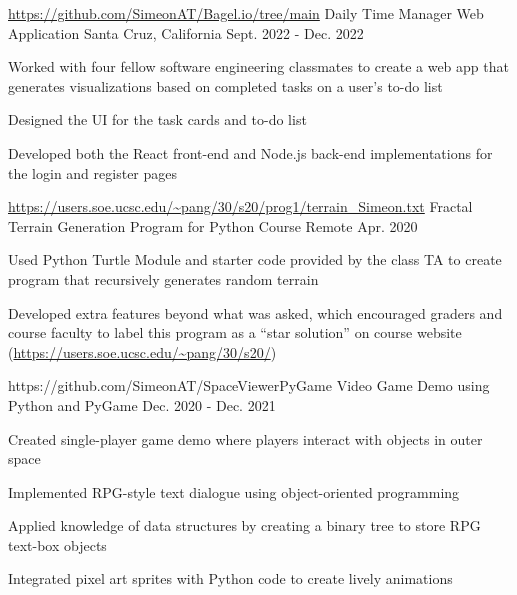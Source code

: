

\begin{cventries}

  \cventry
    {\url{https://github.com/SimeonAT/Bagel.io/tree/main}} %
    {Daily Time Manager Web Application} %
    {Santa Cruz, California} %
    {Sept. 2022 - Dec. 2022} %
    {
      \begin{cvitems} %
        \item { Worked with four fellow software engineering classmates to create a web app that generates
                visualizations based on completed tasks on a user’s to-do list}
        \item {Designed the UI for the task cards and to-do list}
        \item {Developed both the React front-end and Node.js back-end implementations for the login and register
               pages}
      \end{cvitems}
    }

    \cventry
    {\url{https://users.soe.ucsc.edu/~pang/30/s20/prog1/terrain_Simeon.txt}} %
    {Fractal Terrain Generation Program for Python Course} %
    {Remote} %
    {Apr. 2020} %
    {
      \begin{cvitems} %
        \item {Used Python Turtle Module and starter code provided by the class TA to create program that
               recursively generates random terrain}
        \item {Developed extra features beyond what was asked, which encouraged graders and course faculty
               to label this program as a “star solution” on course website (\url{https://users.soe.ucsc.edu/~pang/30/s20/})}
      \end{cvitems}
    }

    \cventry
    {https://github.com/SimeonAT/SpaceViewerPyGame} %
    {Video Game Demo using Python and PyGame} %
    {} %
    {Dec. 2020 - Dec. 2021} %
    {
      \begin{cvitems} %
        \item {Created single-player game demo where players interact with objects in outer space}
        \item {Implemented RPG-style text dialogue using object-oriented programming}
        \item {Applied knowledge of data structures by creating a binary tree to store RPG text-box objects}
        \item {Integrated pixel art sprites with Python code to create lively animations}
      \end{cvitems}
    }

\end{cventries}
